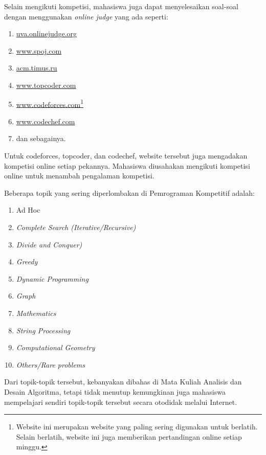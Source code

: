 Selain mengikuti kompetisi, mahasiswa juga dapat menyelesaikan soal-soal dengan menggunakan \textit{online judge} yang ada seperti:
\begin{enumerate}
	\item \url{uva.onlinejudge.org}
	\item \url{www.spoj.com}
	\item \url{acm.timus.ru}
	\item \url{www.topcoder.com}
	\item \url{www.codeforces.com}\footnote{Website ini merupakan website yang paling sering digunakan untuk berlatih. Selain berlatih, website ini juga memberikan pertandingan online setiap minggu.}
	\item \url{www.codechef.com}
	\item dan sebagainya.
\end{enumerate}

Untuk codeforces, topcoder, dan codechef, website tersebut juga mengadakan kompetisi online setiap pekannya. Mahasiswa diusahakan mengikuti kompetisi online untuk menambah pengalaman kompetisi.

Beberapa topik yang sering diperlombakan di Pemrograman Kompetitif adalah:
\begin{enumerate}
	\item Ad Hoc
	\item \textit{Complete Search (Iterative/Recursive)}
	\item \textit{Divide and Conquer)}
	\item \textit{Greedy}
	\item \textit{Dynamic Programming}
	\item \textit{Graph}
	\item \textit{Mathematics}
	\item \textit{String Processing}
	\item \textit{Computational Geometry}
	\item \textit{Others/Rare problems}
\end{enumerate}

Dari topik-topik tersebut, kebanyakan dibahas di Mata Kuliah Analisis dan Desain Algoritma, tetapi tidak menutup kemungkinan juga mahasiswa mempelajari sendiri topik-topik tersebut secara otodidak melalui Internet.

